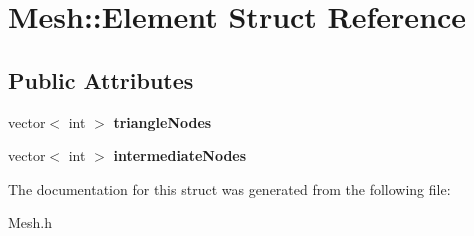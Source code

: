 \hypertarget{struct_mesh_1_1_element}{
\section{Mesh::Element Struct Reference}
\label{struct_mesh_1_1_element}
}
\subsection*{Public Attributes}
\begin{DoxyCompactItemize}
\item 
\hypertarget{struct_mesh_1_1_element_aa0b2f19057a2ea7fb8ddd8a4631e27e3}{
vector$<$ int $>$ {\bfseries triangleNodes}}
\label{struct_mesh_1_1_element_aa0b2f19057a2ea7fb8ddd8a4631e27e3}

\item 
\hypertarget{struct_mesh_1_1_element_ab3599aaa6dc41d6874f885a8d7b42da1}{
vector$<$ int $>$ {\bfseries intermediateNodes}}
\label{struct_mesh_1_1_element_ab3599aaa6dc41d6874f885a8d7b42da1}

\end{DoxyCompactItemize}


The documentation for this struct was generated from the following file:\begin{DoxyCompactItemize}
\item 
Mesh.h\end{DoxyCompactItemize}
